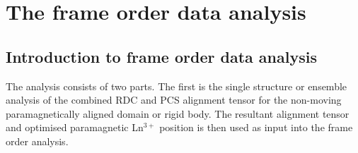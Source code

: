 


\section{The frame order data analysis}

\subsection{Introduction to frame order data analysis}

The analysis consists of two parts.
The first is the single structure or ensemble analysis of the combined RDC and PCS alignment tensor for the non-moving paramagnetically aligned domain or rigid body.
The resultant alignment tensor and optimised paramagnetic Ln$^{3+}$ position is then used as input into the frame order analysis.


